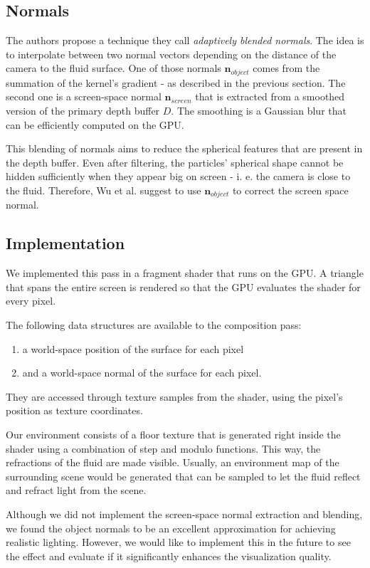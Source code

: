 \subsection{Normals}

The authors propose a technique they call \textit{adaptively blended normals}. The idea is to interpolate between two normal vectors depending on the distance of the camera to the fluid surface. One of those normals $\textbf{n}_{object}$ comes from the summation of the kernel's gradient - as described in the previous section. The second one is a screen-space normal $\textbf{n}_{screen}$ that is extracted from a smoothed version of the primary depth buffer $D$. The smoothing is a Gaussian blur that can be efficiently computed on the GPU.

This blending of normals aims to reduce the spherical features that are present in the depth buffer. Even after filtering, the particles' spherical shape cannot be hidden sufficiently when they appear big on screen - i. e. the camera is close to the fluid. Therefore, Wu et al. suggest to use $\textbf{n}_{object}$ to correct the screen space normal.

\subsection{Implementation}

We implemented this pass in a fragment shader that runs on the GPU. A triangle that spans the entire screen is rendered so that the GPU evaluates the shader for every pixel.

The following data structures are available to the composition pass:
\begin{enumerate}
    \item a world-space position of the surface for each pixel
    \item and a world-space normal of the surface for each pixel.
\end{enumerate}
They are accessed through texture samples from the shader, using the pixel's position as texture coordinates.

Our environment consists of a floor texture that is generated right inside the shader using a combination of step and modulo functions. This way, the refractions of the fluid are made visible. Usually, an environment map of the surrounding scene would be generated that can be sampled to let the fluid reflect and refract light from the scene.

Although we did not implement the screen-space normal extraction and blending, we found the object normals to be an excellent approximation for achieving realistic lighting. However, we would like to implement this in the future to see the effect and evaluate if it significantly enhances the visualization quality.
